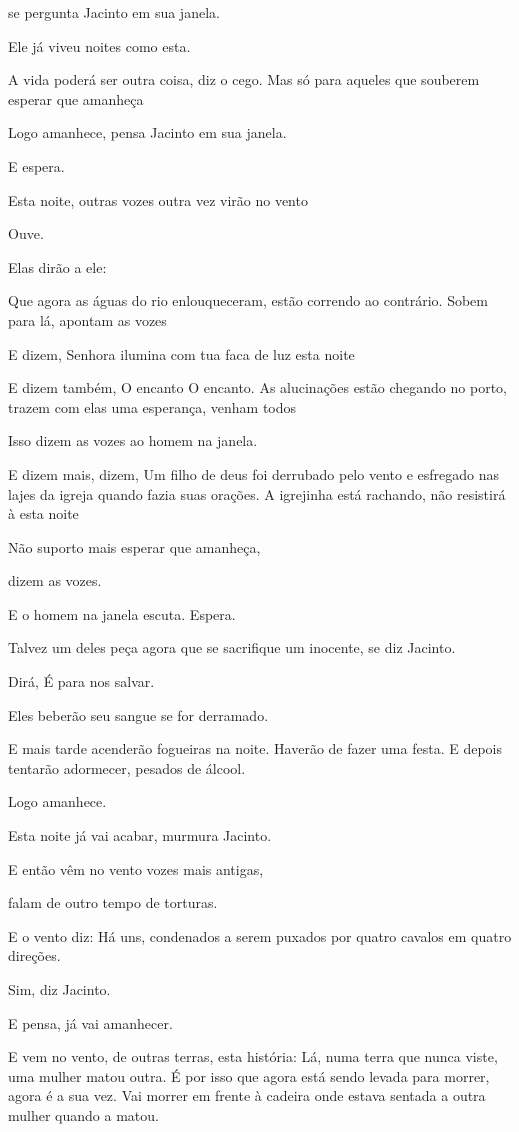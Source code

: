 se pergunta Jacinto em sua janela.

Ele já viveu noites como esta.

A vida poderá ser outra coisa, diz o cego. Mas só para aqueles que
souberem esperar que amanheça

Logo amanhece, pensa Jacinto em sua janela.

E espera.

Esta noite, outras vozes outra vez virão no vento

Ouve.

Elas dirão a ele:

Que agora as águas do rio enlouqueceram, estão correndo ao contrário.
Sobem para lá, apontam as vozes

E dizem, Senhora ilumina com tua faca de luz esta noite

E dizem também, O encanto O encanto. As alucinações estão chegando no
porto, trazem com elas uma esperança, venham todos

Isso dizem as vozes ao homem na janela.

E dizem mais, dizem, Um filho de deus foi derrubado pelo vento e
esfregado nas lajes da igreja quando fazia suas orações. A igrejinha
está rachando, não resistirá à esta noite

Não suporto mais esperar que amanheça,

dizem as vozes.

E o homem na janela escuta. Espera.

Talvez um deles peça agora que se sacrifique um inocente, se diz
Jacinto.

Dirá, É para nos salvar.

Eles beberão seu sangue se for derramado.

E mais tarde acenderão fogueiras na noite. Haverão de fazer uma festa. E
depois tentarão adormecer, pesados de álcool.

Logo amanhece.

Esta noite já vai acabar, murmura Jacinto.

E então vêm no vento vozes mais antigas,

falam de outro tempo de torturas.

E o vento diz: Há uns, condenados a serem puxados por quatro cavalos em
quatro direções.

Sim, diz Jacinto.

E pensa, já vai amanhecer.

E vem no vento, de outras terras, esta história: Lá, numa terra que
nunca viste, uma mulher matou outra. É por isso que agora está sendo
levada para morrer, agora é a sua vez. Vai morrer em frente à cadeira
onde estava sentada a outra mulher quando a matou.

